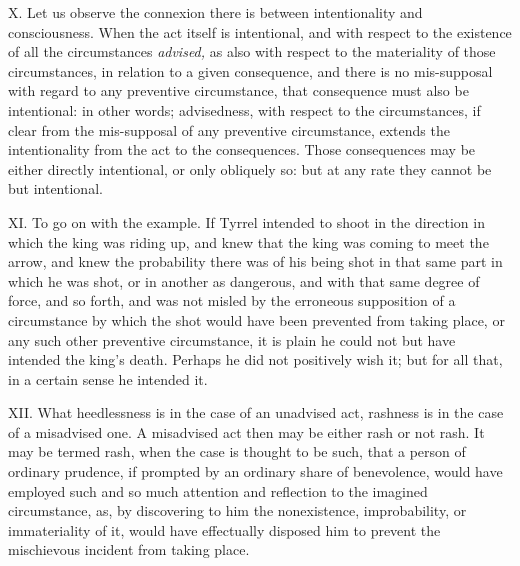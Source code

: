 \documentclass[12pt]{report}
\begin{document}
X. Let us observe the connexion there is between intentionality and
consciousness. When the act itself is intentional, and with respect to
the existence of all the circumstances \emph{advised,} as also with
respect to the materiality of those circumstances, in relation to a
given consequence, and there is no mis-supposal with regard to any
preventive circumstance, that consequence must also be intentional: in
other words; advisedness, with respect to the circumstances, if clear
from the mis-supposal of any preventive circumstance, extends the
intentionality from the act to the consequences. Those consequences may
be either directly intentional, or only obliquely so: but at any rate
they cannot be but intentional.

XI. To go on with the example. If Tyrrel intended to shoot in the
direction in which the king was riding up, and knew that the king was
coming to meet the arrow, and knew the probability there was of his
being shot in that same part in which he was shot, or in another as
dangerous, and with that same degree of force, and so forth, and was not
misled by the erroneous supposition of a circumstance by which the shot
would have been prevented from taking place, or any such other
preventive circumstance, it is plain he could not but have intended the
king's death. Perhaps he did not positively wish it; but for all that,
in a certain sense he intended it.

XII. What heedlessness is in the case of an unadvised act, rashness is
in the case of a misadvised one. A misadvised act then may be either
rash or not rash. It may be termed rash, when the case is thought to be
such, that a person of ordinary prudence, if prompted by an ordinary
share of benevolence, would have employed such and so much attention and
reflection to the imagined circumstance, as, by discovering to him the
nonexistence, improbability, or immateriality of it, would have
effectually disposed him to prevent the mischievous incident from taking
place.
\end{document}
